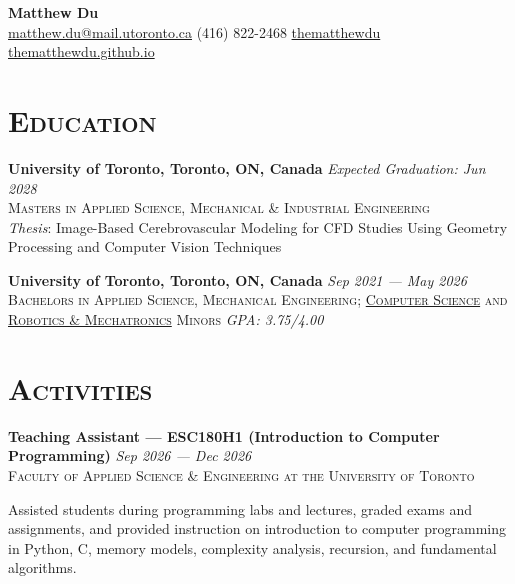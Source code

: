 \documentclass[letterpaper, 10pt]{article}
\newcommand{\vspa}{\vspace{0.1cm}}
\begin{document}
	\begin{center}
		\textbf{\Huge\color{maincol} Matthew Du} \\ \vspace{0.2cm}
		{\small
			{\color{maincol}\faEnvelope} \quad \href{mailto:matthew.du@mail.utoronto.ca}{matthew.du@mail.utoronto.ca} \quad \quad \quad
			{\color{maincol}\faPhone*} \quad (416) 822-2468 \quad \quad \quad
			{\color{maincol}\faLinkedinIn} \quad \href{www.linkedin.com/in/thematthewdu}{thematthewdu} \quad \quad \quad
			{\color{maincol}\faGithub} \quad \href{thematthewdu.github.io}{thematthewdu.github.io}
		}
	\end{center}
	
	\section*{\faUniversity \quad \textsc{Education}}
	\textbf{University of Toronto, Toronto, ON, Canada} \hfill \textit{Expected Graduation: Jun 2028} \\
	\textsc{Masters in Applied Science, Mechanical \& Industrial Engineering} \\
	\textit{Thesis}: Image-Based Cerebrovascular Modeling for CFD Studies Using Geometry Processing and Computer Vision Techniques
	
	\vspa
	
	\textbf{University of Toronto, Toronto, ON, Canada} \hfill \textit{Sep 2021 --- May 2026} \\
	\textsc{Bachelors in Applied Science, Mechanical Engineering; 
		\href{https://artsci.calendar.utoronto.ca/section/Computer-Science}{Computer Science} and
		\href{https://engineering.calendar.utoronto.ca/minor-robotics-and-mechatronics-aeminram}{Robotics \& Mechatronics} Minors
	} \hfill \textit{GPA: 3.75/4.00}
		
	\vspa
	
	\section*{\faUsers \quad \textsc{Activities}}
	\textbf{Teaching Assistant --- ESC180H1 (Introduction to Computer Programming)} \hfill \textit{Sep 2026 --- Dec 2026} \\
	\textsc{Faculty of Applied Science \& Engineering at the University of Toronto}

	Assisted students during programming labs and lectures, graded exams and assignments, and provided instruction on introduction to computer programming in Python, C, memory models, complexity analysis, recursion, and fundamental algorithms.
\end{document}
